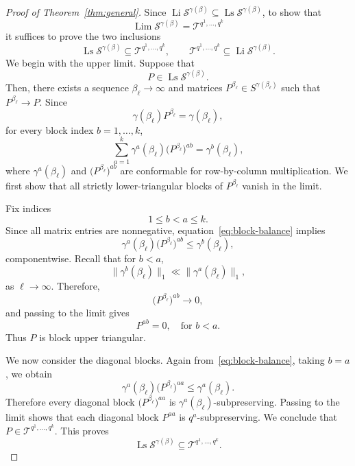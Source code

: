 \documentclass[11pt,a4paper,longbibliography]{amsart}
\numberwithin{equation}{section}
\theoremstyle{plain}
\theoremstyle{definition}
\theoremstyle{remark}
\begin{document}
			
			\begin{proof}[Proof of Theorem~\ref{thm:general}]
				Since $
				\operatorname*{Li}\mathcal{S}^{\gamma(\beta)}
				\subseteq
				\operatorname*{Ls}\mathcal{S}^{\gamma(\beta)}
				$,
				to show that
				$$
				\operatorname*{Lim}\mathcal{S}^{\gamma(\beta)}
				=
				\mathcal T^{q^1,\ldots,q^k}
				$$
				it suffices to prove the two inclusions
				\begin{equation}
					\label{eq:2_inclusions}
					\operatorname*{Ls}\mathcal{S}^{\gamma(\beta)}
					\subseteq
					\mathcal T^{q^1,\ldots,q^k},
					\qquad
					\mathcal T^{q^1,\ldots,q^k}
					\subseteq
					\operatorname*{Li}\mathcal{S}^{\gamma(\beta)}.
				\end{equation}
				We begin with the upper limit. Suppose that
				$$
				P\in\operatorname*{Ls}\mathcal{S}^{\gamma(\beta)}.
				$$
				Then, there exists a sequence $\beta_\ell\to\infty$ and matrices
				$P^{\beta_\ell}\in S^{\gamma(\beta_\ell)}$
				such that $P^{\beta_\ell}\to P$.
				Since
				$$
				\gamma(\beta_\ell)P^{\beta_\ell}
				=
				\gamma(\beta_\ell),
				$$
				for every block index $b=1,\ldots,k$,
				\begin{equation}
					\label{eq:block-balance}
					\sum_{a=1}^k
					\gamma^{a}(\beta_\ell)
					\bigl(P^{\beta_\ell}\bigr)^{ab}
					=
					\gamma^{b}(\beta_\ell),
				\end{equation}
				where $\gamma^{a}(\beta_\ell)$ and 
				$\bigl(P^{\beta_\ell}\bigr)^{ab}$ are conformable for row-by-column multiplication.
				We first show that all strictly lower-triangular blocks of $P^{\beta_{\ell}}$ vanish in the limit.
				
				Fix indices
				$$
				1\le b<a\le k.
				$$
				Since all matrix entries are nonnegative, equation~\eqref{eq:block-balance} implies
				$$
				\gamma^{a}(\beta_\ell)
				\bigl(P^{\beta_\ell}\bigr)^{ab}
				\le
				\gamma^{b}(\beta_\ell),
				$$
				componentwise. Recall that for $b<a$, $$\|\gamma^b(\beta_{\ell})\|_1\ll \|\gamma^a(\beta_{\ell})\|_1,$$ as $\ell\to\infty$. Therefore,
				$$
				\bigl(P^{\beta_\ell}\bigr)^{ab}\to0,
				$$
				and passing to the limit gives
				$$
				P^{ab}=0,
				\quad \text{for $b<a$}.
				$$
				Thus $P$ is block upper triangular.
				
				We now consider the diagonal blocks. Again from~\eqref{eq:block-balance},
				taking $b=a$, we obtain
				$$
				\gamma^{a}(\beta_\ell)
				\bigl(P^{\beta_\ell}\bigr)^{aa}
				\le
				\gamma^{a}(\beta_\ell).
				$$
				Therefore every diagonal block $\bigl(P^{\beta_\ell}\bigr)^{aa}$
				is $\gamma^a(\beta_{\ell})$-subpreserving. Passing to the limit shows that each diagonal block $P^{aa}$ is $q^a$-subpreserving. We conclude that $
				P\in\mathcal T^{q^1,\ldots,q^k}$.
				This proves
				$$
				\operatorname*{Ls}\mathcal{S}^{\gamma(\beta)}
				\subseteq
				\mathcal T^{q^1,\ldots,q^k}.
				$$
				

\end{proof}
\end{document}
